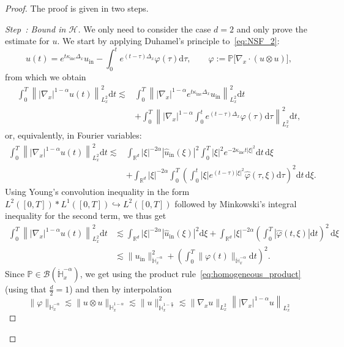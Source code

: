 \documentclass[10pt]{amsart}
\theoremstyle{definition}\newtheorem{defi}[theo]{Definition}\newtheorem{rema}[theo]{Remark}\newtheorem{exam}[theo]{Example}\newtheorem{exem}[theo]{Example}\newtheorem{nota}[theo]{Notation}
\newcommand{\ini}{\mathrm{in}}
\renewcommand{\d}{\mathrm{d}}
\newcommand{\Inc}{\mathrm{inc}}
\newcommand{\R}{\mathbb{R}}
\newcommand{\bbH}{\mathbb{H}}
\newcommand{\bbP}{\mathbb{P}}
\newcommand{\BBB}{\mathscr{B}}
\newcommand{\HHH}{\mathscr{H}}
\newcommand{\SSSs}{\HHH}
\newcounter{stepcount}
\newenvironment{step}[1]{\refstepcounter{stepcount}\begin{proof}[Step~\thestepcount: #1]}{\let\qed\relax\end{proof}}
\begin{document}
\begin{proof}
The proof is given in two steps.
\setcounter{stepcount}{0}
\begin{step}{{Bound in $\SSSs$}}
We only need to consider the case $d = 2$ and only prove the estimate for $u$. We start by applying Duhamel's principle to~\eqref{eq:NSF_2}:
\[
u(t) = e^{t \kappa_\Inc \Delta_x} u_\ini - \int_0^t e^{(t-\tau) \Delta_x} \varphi(\tau) \d \tau, \qquad \varphi := \bbP \big[\nabla_x \cdot \left(u \otimes u \right) \big],
\]
from which we obtain
\begin{align*}
\int_0^T \left\| |\nabla_x|^{ 1 - \alpha } u(t) \right\|^2_{ L^2_x } \d t \lesssim & \int_0^T \left\| |\nabla_x|^{ 1 - \alpha } e^{ t \kappa_\Inc \Delta_x} u_\ini \right\|_{L^2_x}^2 \d t \\
& + \int_0^T \left\| |\nabla_x|^{ 1 - \alpha } \int_0^t e^{(t-\tau) \Delta_x} \varphi(\tau) \d \tau \right\|_{L^2_x}^2 \d t,
\end{align*}
or, equivalently, in Fourier variables:
\begin{equation*}
\begin{split}
\int_0^T \left\| |\nabla_x|^{ 1 - \alpha } u(t) \right\|^2_{ L^2_x } \d t \lesssim & \int_{\R^{d}} | \xi |^{-2 \alpha} \left| \widehat{u}_\ini(\xi) \right|^2 \int_0^T | \xi |^2 e^{ - 2 \kappa_\Inc t |\xi|^2} \d t \, \d \xi \\
& + \int_{\R^{d}} | \xi|^{ - 2 \alpha } \int_0^T \left(\int_0^t | \xi | e^{(t-\tau) |\xi|^2} \widehat{\varphi}(\tau, \xi) \d \tau \right)^2 \d t \, \d \xi.
\end{split}
\end{equation*}
Using Young's convolution inequality in the form $L^2([0, T]) \ast L^1([0, T]) \hookrightarrow L^2([0, T])$ followed by Minkowski's integral inequality for the second term, we thus get
\begin{align*}
\int_0^T \left\| |\nabla_x|^{ 1 - \alpha } u(t) \right\|^2_{ L^2_x } \d t &\lesssim \int_{\R^{d}} | \xi |^{-2 \alpha} \left| \widehat{u}_\ini(\xi) \right|^2 \d \xi + \int_{\R^{d}} | \xi|^{ - 2 \alpha } \left(\int_0^T \left| \widehat{\varphi}(t, \xi) \right| \d t\right)^2 \, \d \xi \\
&\lesssim \| u_\ini \|^2_{ \dot{\bbH}^{-\alpha}_x } + \left(\int_0^T \| \varphi(t) \|_{ \dot{\bbH}^{-\alpha}_x } \d t\right)^2.
\end{align*}
Since $\bbP \in \BBB\left(\dot{\bbH}_x^{-\alpha} \right)$, we get using the product rule~\eqref{eq:homogeneous_product} (using that $\frac{d}{2} = 1$) and then by interpolation
\[
\| \varphi \|_{ \dot{\bbH}_x^{-\alpha} } \lesssim \| u \otimes u \|_{\dot{\bbH}_x^{1-\alpha}} \lesssim \| u \|_{\dot{\bbH}_x^{1-\frac{\alpha}{2}}}^2 \lesssim \| \nabla_x u \|_{L^2_x} \left\| | \nabla_x |^{1-\alpha} u \right\|_{L^2_x}
\]
\end{step}
\end{proof}
\end{document}
